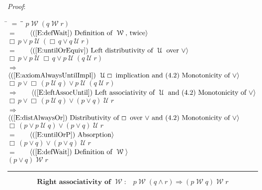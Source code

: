 \documentclass[12pt, fleqn, leqno]{article}
\newcommand{\lgap}{2pt}                             %
\newcommand{\mymathindent}{24pt}                    %
\newcommand{\impl}{\ensuremath{\Rightarrow}}        %
\newcommand{\Until}{\;\mathcal{U}\;}
\newcommand{\Wait}{\;\mathcal{W}\;}
\newcommand{\Always}{\Box\,}
\newcommand{\myqed}{\rule[-.23ex]{1.2ex}{2.0ex}}
\newcommand{\myqedtab}{\hspace{384pt}}              %
\newcommand{\Gll} {\langle}                         %
\newcommand{\Ggg} {\rangle}                         %
\newcommand{\Hint}[1]     {\ \ \ $\Gll              \mbox{#1} \Ggg$ }   %
\begin{document}
\emph{Proof}:
\begin{tabbing}
\hspace{\mymathindent} \= $= \;$ \= \myqedtab \= \kill
\> \>   $p \Wait (q \Wait r)$\\[\lgap]
\> $=$ \> \Hint{(\ref{E:defWait}) Definition of $\Wait$, twice} \\[\lgap]
\> \>   $\Always p\lor p\Until (\Always q\lor q \Until r)$\\[\lgap]
\> $=$  \>  \Hint{(\ref{E:untilOrEquiv}) Left distributivity of $\Until$ over $\lor$}\\[\lgap]
\> \>   $\Always p\lor p\Until \Always q\lor p\Until (q \Until r)$\\[\lgap]
\> $\impl$ \> \Hint{(\ref{E:axiomAlwaysUntilImpl}) $\Until\Always$ implication and (4.2) Monotonicity of $\lor$}\\[\lgap]
\> \>   $\Always p\lor \Always (p\Until q)\lor p\Until (q \Until r)$\\[\lgap]
\> $\impl$ \> \Hint{(\ref{E:leftAssocUntil}) Left associativity of $\Until$ and (4.2) Monotonicity of $\lor$} \\[\lgap]
\> \>   $\Always p\lor \Always (p\Until q)\lor (p\lor q) \Until r$\\[\lgap]
  \> $\impl$  \>  \Hint{(\ref{E:distAlwaysOr}) Distributivity of $\Always$ over $\lor$ and (4.2) Monotonicity of $\lor$}\\[\lgap]
\> \>   $\Always (p\lor p\Until q)\lor (p\lor q) \Until r$\\[\lgap]
\> $=$ \> \Hint{(\ref{E:untilOrP}) Absorption} \\[\lgap]
\> \>   $\Always (p\lor q)\lor (p\lor q) \Until r$\\[\lgap]
\> $=$ \> \Hint{(\ref{E:defWait}) Definition of $\Wait$} \\[\lgap]
\> \>   $(p\lor q) \Wait r$ \quad \myqed
\end{tabbing}
\begin{equation}\label{E:rightAssocWait}
\textbf{Right associativity of $\Wait$:}\quad p \Wait (q \land r) \impl (p \Wait q) \Wait r
\end{equation}
\end{document}
